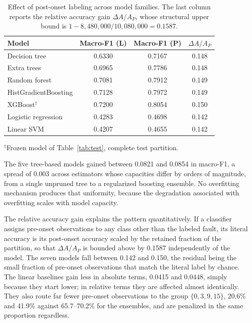 \documentclass[12pt,a4paper]{article}
\begin{document}
\begin{table}[t]
\centering
\caption{Effect of post-onset labeling across model families. The last column
reports the relative accuracy gain $\Delta A/A_P$, whose structural upper bound
is $1-8{,}480{,}000/10{,}080{,}000=0.1587$.}
\label{tab:generality}
\small
\begin{tabular}{lccc}
\toprule
Model & Macro-F1 (L) & Macro-F1 (P) & $\Delta A/A_P$\\
\midrule
Decision tree           & 0.6330 & 0.7167 & 0.148\\
Extra trees             & 0.6965 & 0.7786 & 0.148\\
Random forest           & 0.7081 & 0.7912 & 0.149\\
HistGradientBoosting    & 0.7128 & 0.7972 & 0.149\\
XGBoost$^{\dagger}$     & 0.7200 & 0.8054 & 0.150\\
Logistic regression     & 0.4283 & 0.4698 & 0.142\\
Linear SVM              & 0.4207 & 0.4655 & 0.142\\
\bottomrule
\end{tabular}

\vspace{2pt}
{\footnotesize $^{\dagger}$Frozen model of Table~\ref{tab:test}, complete test
partition.}
\end{table}

The five tree-based models gained between 0.0821 and 0.0854 in macro-F1, a
spread of 0.003 across estimators whose capacities differ by orders of
magnitude, from a single unpruned tree to a regularized boosting ensemble. No
overfitting mechanism produces that uniformity, because the degradation
associated with overfitting scales with model capacity.

The relative accuracy gain explains the pattern quantitatively. If a classifier
assigns pre-onset observations to any class other than the labeled fault, its
literal accuracy is its post-onset accuracy scaled by the retained fraction of
the partition, so that $\Delta A/A_P$ is bounded above by 0.1587 independently
of the model. The seven models fall between 0.142 and 0.150, the residual being
the small fraction of pre-onset observations that match the literal label by
chance. The linear baselines gain less in absolute terms, 0.0415 and 0.0448,
simply because they start lower; in relative terms they are affected almost
identically. They also route far fewer pre-onset observations to the group
$\{0,3,9,15\}$, 20.6\% and 41.9\% against 65.7--70.2\% for the ensembles, and
are penalized in the same proportion regardless.
\end{document}
